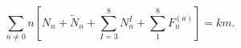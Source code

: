 \begin{equation}
\sum_{n \neq 0} n \left[ N_n + \tilde{N}_n + 
  \sum_{I=3}^8 N_n^I + \sum_{1}^8 F^{(a)}_n    \right] = k m. 
\end{equation}

